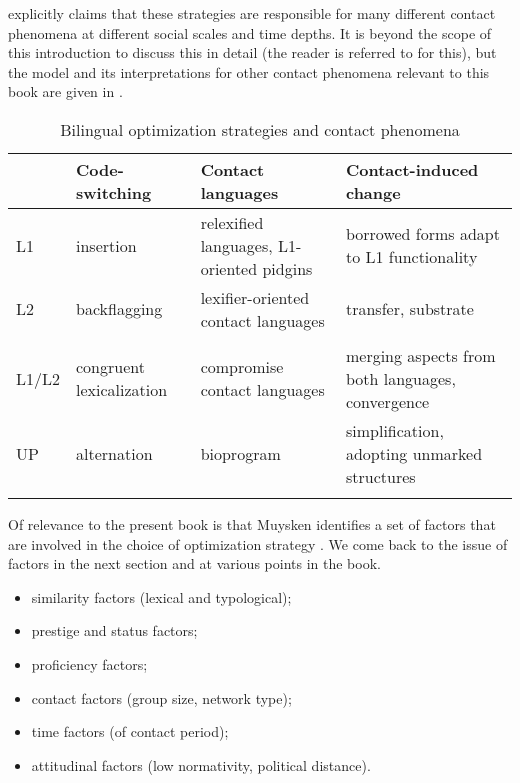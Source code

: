 \documentclass[output=paper]{langscibook}
\begin{document}
\textcite{muysken2013language} explicitly claims that these strategies are responsible for many different contact phenomena at different social scales and time depths. It is beyond the scope of this introduction to discuss this in detail (the reader is referred to \cite{muysken2013language} for this), but the model and its interpretations for other contact phenomena relevant to this book are given in .

\begin{table}
\caption{Bilingual optimization strategies and contact phenomena}  
\label{tab-muysken}
 \begin{tabularx}{\textwidth}{l QQQ} 
  \lsptoprule
 & Code-switching & Contact languages & Contact-induced change \\ 
  \midrule
  L1 & insertion & relexified languages, L1-oriented pidgins & borrowed forms adapt to L1 functionality 
  
  \\
  
  L2 & backflagging & lexifier-oriented contact languages  & transfer, substrate\\
  &&&
  
  \\
  
  L1/L2 & congruent lexicalization & compromise contact languages & merging aspects from both languages, convergence
  
  \\
  
  UP & alternation & bioprogram & simplification, adopting unmarked structures\\
   \lspbottomrule
 \end{tabularx}
\end{table}

Of relevance to the present book is that Muysken identifies a set of factors that are involved in the choice of optimization strategy \parencite[726]{muysken2013language}. We come back to the issue of factors in the next section and at various points in the book.

\begin{itemize}
\item similarity factors (lexical and typological);
\item prestige and status factors;
\item proficiency factors;
\item contact factors (group size, network type);
\item time factors (of contact period);
\item attitudinal factors (low normativity, political distance).
\end{itemize}
\end{document}

